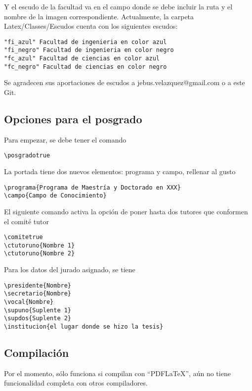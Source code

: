 \documentclass[]{article}
\begin{document}
Y el escudo de la facultad va en el campo \escudofacultad{ } donde se
debe incluir la ruta y el nombre de la imagen correspondiente.
Actualmente, la carpeta Latex/Classes/Escudos cuenta con los siguientes
escudos:

\begin{verbatim}
"fi_azul" Facultad de ingenieria en color azul
"fi_negro" Facultad de ingenieria en color negro
"fc_azul" Facultad de ciencias en color azul
"fc_negro" Facultad de ciencias en color negro
\end{verbatim}

Se agradecen sus aportaciones de escudos a jebus.velazquez@gmail.com o a
este Git.

\subsection{Opciones para el posgrado}\label{opciones-para-el-posgrado}

Para empezar, se debe tener el comando

\begin{verbatim}
\posgradotrue
\end{verbatim}

La portada tiene dos nuevos elementos: programa y campo, rellenar al
gusto

\begin{verbatim}
\programa{Programa de Maestría y Doctorado en XXX}
\campo{Campo de Conocimiento}
\end{verbatim}

El siguiente comando activa la opción de poner hasta dos tutores que
conformen el comité tutor

\begin{verbatim}
\comitetrue
\ctutoruno{Nombre 1}
\ctutoruno{Nombre 2}
\end{verbatim}

Para los datos del jurado asignado, se tiene

\begin{verbatim}
\presidente{Nombre}
\secretario{Nombre}
\vocal{Nombre}
\supuno{Suplente 1}
\supdos{Suplente 2}
\institucion{el lugar donde se hizo la tesis}
\end{verbatim}

\subsection{Compilación}\label{compilaciuxf3n}

Por el momento, sólo funciona si compilan con ``PDFLaTeX'', aún no tiene
funcionalidad completa con otros compiladores.
\end{document}
